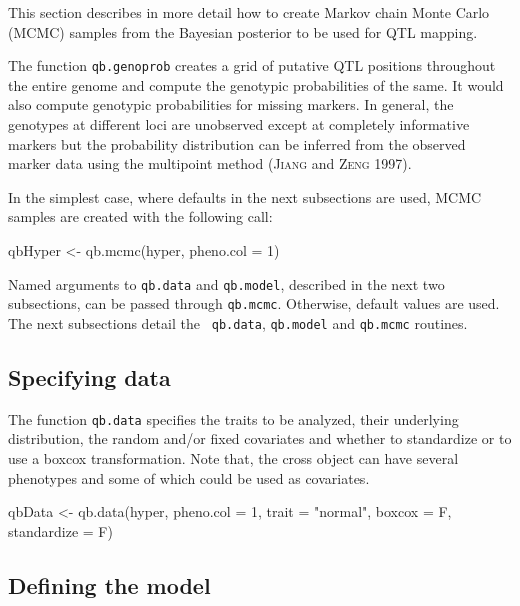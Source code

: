 \documentclass{article}
\begin{document}
This section describes in more detail how to create Markov chain Monte
Carlo (MCMC) samples from the Bayesian posterior to be used for QTL
mapping.

The function {\tt qb.genoprob} creates a grid of putative QTL
positions throughout the entire genome and compute the genotypic
probabilities of the same. It would also compute genotypic
probabilities for missing markers. In general, the genotypes at
different loci are unobserved except at completely informative
markers but the probability distribution can be inferred from the
observed marker data using the multipoint method (\textsc{Jiang} and
\textsc{Zeng} 1997).

In the simplest case, where defaults in the next subsections are used,
MCMC samples are created with the following call:

\begin{Schunk}
\begin{Sinput}
qbHyper <- qb.mcmc(hyper, pheno.col = 1)
\end{Sinput}
\end{Schunk}

Named arguments to {\tt qb.data} and {\tt qb.model}, described in the
next two subsections, can be passed through {\tt qb.mcmc}. Otherwise,
default values are used. The next subsections detail the {\tt
qb.data}, {\tt qb.model} and {\tt qb.mcmc} routines.


\subsection{Specifying data}

The function {\tt qb.data} specifies the traits to be analyzed, their underlying
distribution, the random and/or fixed covariates and whether to standardize or to
use a boxcox transformation. Note that, the cross object can have several phenotypes
and some of which could be used as covariates.


\begin{Schunk}
\begin{Sinput}
qbData <- qb.data(hyper, pheno.col = 1, trait = "normal",
  boxcox = F, standardize = F)
\end{Sinput}
\end{Schunk}

\subsection{Defining the model}
\end{document}
